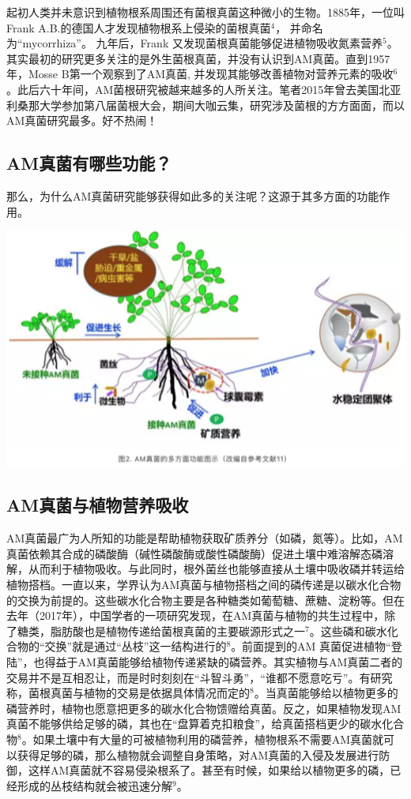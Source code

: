 \documentclass[]{book}
\begin{document}
起初人类并未意识到植物根系周围还有菌根真菌这种微小的生物。1885年，一位叫Frank
A.B.的德国人才发现植物根系上侵染的菌根真菌\(^4\)，
并命名为``mycorrhiza''。 九年后，Frank
又发现菌根真菌能够促进植物吸收氮素营养\(^5\)。其实最初的研究更多关注的是外生菌根真菌，并没有认识到AM真菌。直到1957年，Mosse
B第一个观察到了AM真菌,
并发现其能够改善植物对营养元素的吸收\(^6\)。此后六十年间，AM菌根研究被越来越多的人所关注。笔者2015年曾去美国北亚利桑那大学参加第八届菌根大会，期间大咖云集，研究涉及菌根的方方面面，而以AM真菌研究最多。好不热闹！

\subsection{AM真菌有哪些功能？}\label{am}

那么，为什么AM真菌研究能够获得如此多的关注呢？这源于其多方面的功能作用。

\includegraphics[width=6.67in]{images/am2}

\subsection{AM真菌与植物营养吸收}\label{am}

AM真菌最广为人所知的功能是帮助植物获取矿质养分（如磷，氮等）。比如，AM真菌依赖其合成的磷酸酶（碱性磷酸酶或酸性磷酸酶）促进土壤中难溶解态磷溶解，从而利于植物吸收。与此同时，根外菌丝也能够直接从土壤中吸收磷并转运给植物搭档。一直以来，学界认为AM真菌与植物搭档之间的磷传递是以碳水化合物的交换为前提的。这些碳水化合物主要是各种糖类如葡萄糖、蔗糖、淀粉等。但在去年（2017年），中国学者的一项研究发现，在AM真菌与植物的共生过程中，除了糖类，脂肪酸也是植物传递给菌根真菌的主要碳源形式之一\(^7\)。这些磷和碳水化合物的``交换''就是通过``丛枝''这一结构进行的\(^8\)。前面提到的AM
真菌促进植物``登陆''，也得益于AM真菌能够给植物传递紧缺的磷营养。其实植物与AM真菌二者的交易并不是互相忍让，而是时时刻刻在``斗智斗勇''，``谁都不愿意吃亏''。有研究称，菌根真菌与植物的交易是依据具体情况而定的\(^8\)。当真菌能够给以植物更多的磷营养时，植物也愿意把更多的碳水化合物馈赠给真菌。反之，如果植物发现AM真菌不能够供给足够的磷，其也在``盘算着克扣粮食''，给真菌搭档更少的碳水化合物\(^8\)。如果土壤中有大量的可被植物利用的磷营养，植物根系不需要AM真菌就可以获得足够的磷，那么植物就会调整自身策略，对AM真菌的入侵及发展进行防御，这样AM真菌就不容易侵染根系了。甚至有时候，如果给以植物更多的磷，已经形成的丛枝结构就会被迅速分解\(^9\)。
\end{document}
